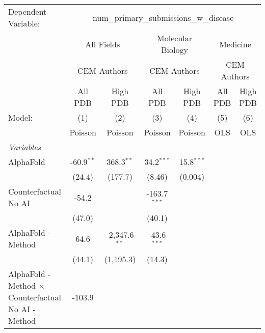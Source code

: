 \begingroup
\centering
\begin{tabular}{lcccccc}
   \tabularnewline \midrule \midrule
   Dependent Variable: & \multicolumn{6}{c}{num\_primary\_submissions\_w\_disease}\\
 & \multicolumn{2}{c}{All Fields} & \multicolumn{2}{c}{Molecular Biology} & \multicolumn{2}{c}{Medicine} \\
\cmidrule(lr){2-3} \cmidrule(lr){4-5} \cmidrule(lr){6-7}
 & \multicolumn{2}{c}{CEM Authors} & \multicolumn{2}{c}{CEM Authors} & \multicolumn{2}{c}{CEM Authors} \\
\cmidrule(lr){2-3} \cmidrule(lr){4-5} \cmidrule(lr){6-7}
 & \multicolumn{1}{c}{All PDB} & \multicolumn{1}{c}{High PDB} & \multicolumn{1}{c}{All PDB} & \multicolumn{1}{c}{High PDB} & \multicolumn{1}{c}{All PDB} & \multicolumn{1}{c}{High PDB} \\
\cmidrule(lr){2-2} \cmidrule(lr){3-3} \cmidrule(lr){4-4} \cmidrule(lr){5-5} \cmidrule(lr){6-6} \cmidrule(lr){7-7}
   Model:                                                     & (1)          & (2)             & (3)            & (4)          & (5)  & (6)\\  
                                                              &  Poisson     & Poisson         & Poisson        & Poisson      & OLS  & OLS\\  
   \midrule
   \emph{Variables}\\
   AlphaFold                                                  & -60.9$^{**}$ & 368.3$^{**}$    & 34.2$^{***}$   & 15.8$^{***}$ &      &   \\   
                                                              & (24.4)       & (177.7)         & (8.46)         & (0.004)      &      &   \\   
   Counterfactual No AI                                       & -54.2        &                 & -163.7$^{***}$ &              &      &   \\   
                                                              & (47.0)       &                 & (40.1)         &              &      &   \\   
   AlphaFold - Method                                         & 64.6         & -2,347.6$^{**}$ & -43.6$^{***}$  &              &      &   \\   
                                                              & (44.1)       & (1,195.3)       & (14.3)         &              &      &   \\   
   AlphaFold - Method $\times$ Counterfactual No AI - Method  & -103.9       &                 &                &              &      &   \\   

\end{tabular}
